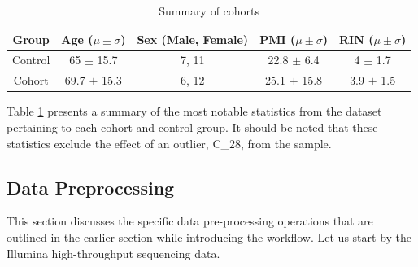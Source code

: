 \begin{table}[H]
\centering
\begin{tabular}{ccccc}
\toprule
Group & Age ($\mu \pm \sigma$) & Sex (Male, Female) & PMI ($\mu \pm \sigma$) & RIN ($\mu \pm \sigma$) \\
\midrule
Control & 65 $\pm$ 15.7 & 7, 11 & 22.8 $\pm$ 6.4 & 4 $\pm$ 1.7 \\
Cohort & 69.7 $\pm$ 15.3 & 6, 12 & 25.1 $\pm$ 15.8 & 3.9 $\pm$ 1.5 \\
\bottomrule
\end{tabular}
\caption{Summary of cohorts}
\label{table:cohort_info}
\end{table}
\noindent Table \ref{table:cohort_info} presents a summary of the most notable statistics from the dataset pertaining to each cohort and control group. It should be noted that these statistics exclude the effect of an outlier, C\_28, from the sample.

\subsection{Data Preprocessing}
This section discusses the specific data pre-processing operations that are outlined in the earlier section while introducing the workflow. Let us start by the Illumina high-throughput sequencing data.


